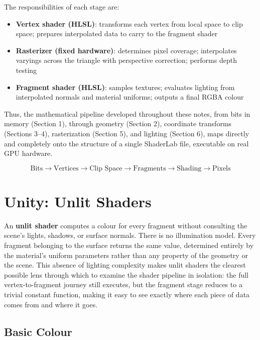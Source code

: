 \documentclass[11pt]{article}
\begin{document}
The responsibilities of each stage are:

\begin{itemize}
    \item \textbf{Vertex shader (HLSL)}: transforms each vertex from local space to clip space; prepares interpolated data to carry to the fragment shader
    \item \textbf{Rasterizer (fixed hardware)}: determines pixel coverage; interpolates varyings across the triangle with perspective correction; performs depth testing
    \item \textbf{Fragment shader (HLSL)}: samples textures; evaluates lighting from interpolated normals and material uniforms; outputs a final RGBA colour
\end{itemize}

Thus, the mathematical pipeline developed throughout these notes, from bits in memory (Section 1), through geometry (Section 2), coordinate transforms (Sections 3--4), rasterization (Section 5), and lighting (Section 6), maps directly and completely onto the structure of a single ShaderLab file, executable on real GPU hardware.

\begin{equation}
    \text{Bits} \rightarrow \text{Vertices} \rightarrow \text{Clip Space} \rightarrow \text{Fragments} \rightarrow \text{Shading} \rightarrow \text{Pixels}
\end{equation}


\section{Unity: Unlit Shaders}

An \textbf{unlit shader} computes a colour for every fragment without consulting the scene's lights, shadows, or surface normals. There is no illumination model. Every fragment belonging to the surface returns the same value, determined entirely by the material's uniform parameters rather than any property of the geometry or the scene. This absence of lighting complexity makes unlit shaders the clearest possible lens through which to examine the shader pipeline in isolation: the full vertex-to-fragment journey still executes, but the fragment stage reduces to a trivial constant function, making it easy to see exactly where each piece of data comes from and where it goes.

\subsection{Basic Colour}
\end{document}
